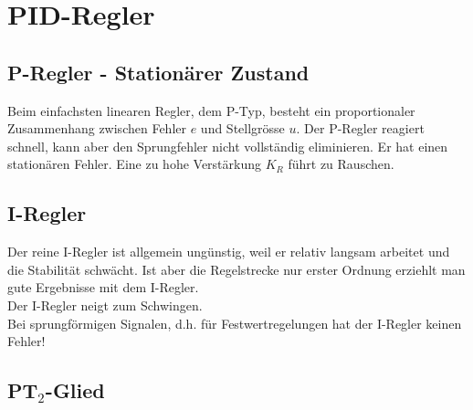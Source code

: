 \section{PID-Regler }

	\subsection{P-Regler - Stationärer Zustand }
		Beim einfachsten linearen Regler, dem P-Typ, besteht ein proportionaler
		Zusammenhang zwischen Fehler $e$ und Stellgrösse $u$.
		Der P-Regler reagiert schnell, kann aber den Sprungfehler nicht vollständig
		eliminieren. Er hat einen stationären Fehler. Eine zu hohe Verstärkung $K_R$ führt
    zu Rauschen.


	\subsection{I-Regler }
		Der reine I-Regler ist allgemein ungünstig, weil er relativ langsam arbeitet
		und die Stabilität schwächt. Ist aber die Regelstrecke nur erster Ordnung
		erziehlt man gute Ergebnisse mit dem I-Regler.\\
		Der I-Regler neigt zum Schwingen.\\
		Bei sprungförmigen Signalen, d.h. für Festwertregelungen hat der I-Regler
		keinen Fehler!


	\subsection{PT$_2$-Glied }
